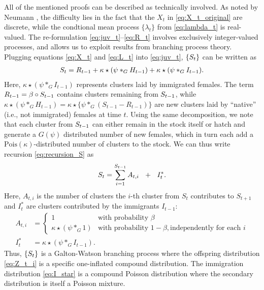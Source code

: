 \documentclass[review]{elsarticle}
\begin{document}
All of the mentioned proofs can be described as technically involved. As noted by Neumann \cite{Neumann2011}, the difficulty lies in the fact that the $X_t$ in \eqref{eq:X_t_original} are discrete, while the condtional mean process $\{\lambda_t\}$ from \eqref{eq:lambda_t} is real-valued. The re-formulation \eqref{eq:juv_t}--\eqref{eq:R_t} involves exclusively integer-valued processes, and allows us to exploit results from branching process theory. Plugging equations \eqref{eq:X_t} and \eqref{eq:L_t} into \eqref{eq:juv_t}, $\{S_t\}$ can be written as
\begin{align}
S_t = R_{t - 1} + \kappa \star (\psi *_G H_{t - 1}) + \kappa \star (\psi *_G I_{t - 1}). \label{eq:recursion_S}
\end{align}
Here, $\kappa \star (\psi *_G I_{t - 1})$ represents clusters laid by immigrated females. The term  $R_{t - 1} = \beta \circ S_{t - 1}$ contains clusters remaining from $ S_{t - 1}$, while $\kappa \star (\psi *_G H_{t - 1}) = \kappa \star \{\psi *_G (S_{t - 1} - R_{t - 1})\}$ are new clusters laid by ``native'' (i.e., not immigrated) females at time $t$. Using the same decomposition, we note that each cluster from $S_{t - 1}$ can either remain in the stock itself or hatch and generate a $G(\psi)$ distributed number of new females, which in turn each add a $\text{Pois}(\kappa)$-distributed number of clusters to the stock. We can thus write recursion \eqref{eq:recursion_S} as
$$
\juv_t = \sum_{i = 1}^{\juv_{t - 1}} A_{t, i} \ \ + \ \ I^*_t.
$$
Here, $A_{t, i}$ is the number of clusters the $i$-th cluster from $S_t$ contributes to $S_{t + 1}$ and $I^*_t$ are clusters contributed by the immigrants $I_{t - 1}$:
\begin{align}
A_{t, i} & = \begin{cases}
1 & \text{with probability } \beta\\
\kappa \star (\psi *_G 1) & \text{with probability } 1 - \beta, \text{independently for each } i
\label{eq:Z_t_i}
\end{cases}\\
I^*_t & = \kappa\star (\psi *_G I_{t - 1}). \label{eq:I_star}
\end{align}
Thus, $\{S_t\}$ is a Galton-Watson branching process where the offspring distribution \eqref{eq:Z_t_i} is a specific one-inflated compound distribution. %
The immigration distribution \eqref{eq:I_star} is a compound Poisson distribution where the secondary distribution is itself a Poisson mixture. %
\end{document}
